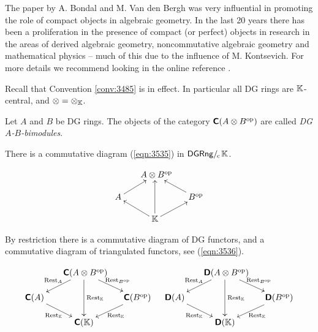 \begin{rem}
The paper \cite{BonVdB} by A. Bondal and M. Van den Bergh was very influential 
in promoting the role of compact objects in algebraic geometry. 
In the last 20 years there has been a proliferation in the presence of compact 
(or perfect) objects in research in the areas of derived algebraic geometry,  
noncommutative algebraic geometry and mathematical physics -- much of this due 
to the influence of M. Kontsevich. For more details we recommend looking in the 
online reference \cite{nLab}. 
\end{rem}



 \label{subsec:der-morita}

Recall that Convention \ref{conv:3485} is in effect.
In particular all DG rings are $\mathbb{K}$-central, and 
$\otimes = \otimes_{\mathbb{K}}$.

\begin{dfn} \label{dfn:3525}
Let $A$ and $B$ be DG rings. The objects of the category 
$\boldsymbol{\mathsf{C}}(A \otimes B^{\mathrm{op}})$
are called 
{\em DG $A$-$B$-bimodules}. 
\end{dfn}

There is a commutative diagram (\ref{eqn:3535}) 
in $\mathrm{\mathsf{DGRng}} /_{\mspace{-2mu} \mathrm{c}} \mspace{2mu} \mathbb{K}$.

\begin{equation} \label{eqn:3535}
\UseTips  \xymatrix @C=3ex @R=3ex {
&
\ A \ot B^{\mrm{op}}
\\
A
\ar[ur]
&
&
B^{\mrm{op}}
\ar[ul]
\\
&
\K 
\ar[ul]
\ar[ur]
\ar[uu]
}
\end{equation}

By restriction there is a commutative diagram of DG 
functors, and a commutative diagram of triangulated functors, see 
(\ref{eqn:3536}).

\begin{equation} \label{eqn:3536}
\UseTips  \xymatrix @C=3ex @R=3ex {
&
\ \dcat{C}(A \ot B^{\mrm{op}})
\ar[dl]_{\opn{Rest}_{A}}
\ar[dr]^{\opn{Rest}_{B^{\mrm{op}}}}
\ar[dd]^{\opn{Rest}_{\K}}
\\
\dcat{C}(A)
\ar[dr]_{\opn{Rest}_{\K}}
&
&
\dcat{C}(B^{\mrm{op}})
\ar[dl]^{\opn{Rest}_{\K}}
\\
&
\dcat{C}(\K) 
}
\quad 
\UseTips  \xymatrix @C=3ex @R=3ex {
&
\ \dcat{D}(A \ot B^{\mrm{op}})
\ar[dl]_{\opn{Rest}_{A}}
\ar[dr]^{\opn{Rest}_{B^{\mrm{op}}}}
\ar[dd]^{\opn{Rest}_{\K}}
\\
\dcat{D}(A)
\ar[dr]_{\opn{Rest}_{\K}}
&
&
\dcat{D}(B^{\mrm{op}})
\ar[dl]^{\opn{Rest}_{\K}}
\\
&
\dcat{D}(\K) 
}
\end{equation}

